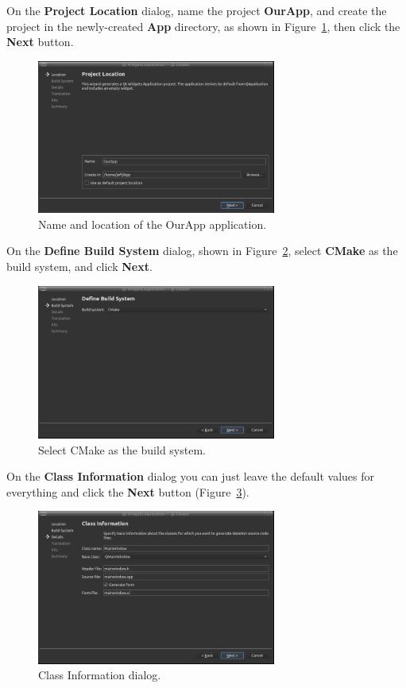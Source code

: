 \documentclass[letterpaper]{article}
\begin{document}
On the \textbf{Project Location} dialog, name the project \textbf{OurApp},
and create the project in the newly-created \textbf{App} directory, as shown
in Figure~\ref{fig:create_ourapp_2}, then
click the \textbf{Next} button.
\begin{figure}[H]
  \centering
  \includegraphics[width=0.7\textwidth]{create_ourapp_2.png}
  \caption{Name and location of the OurApp application.}
  \label{fig:create_ourapp_2}
\end{figure}

On the \textbf{Define Build System} dialog, shown in Figure~\ref{fig:create_ourapp_3},
select \textbf{CMake} as the build system, and click \textbf{Next}.
\begin{figure}[H]
  \centering
  \includegraphics[width=0.7\textwidth]{create_ourapp_3.png}
  \caption{Select CMake as the build system.}
  \label{fig:create_ourapp_3}
\end{figure}

On the \textbf{Class Information} dialog you can just leave the default values
for everything and click the \textbf{Next} button (Figure~\ref{fig:create_ourapp_4}).
\begin{figure}[H]
  \centering
  \includegraphics[width=0.7\textwidth]{create_ourapp_4.png}
  \caption{Class Information dialog.}
  \label{fig:create_ourapp_4}
\end{figure}
\end{document}
